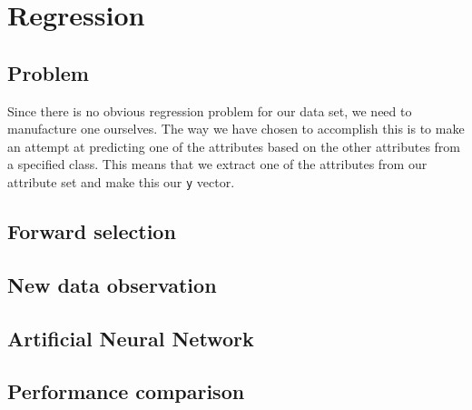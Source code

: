 \chapter{Regression}

\section{Problem}
Since there is no obvious regression problem for our data set, we need to manufacture one ourselves. The way we have chosen to accomplish this is to make an attempt at predicting one of the attributes based on the other attributes from a specified class. This means that we extract one of the attributes from our attribute set and make this our \texttt{y} vector.

\section{Forward selection}

\section{New data observation}


\section{Artificial Neural Network}


\section{Performance comparison}
